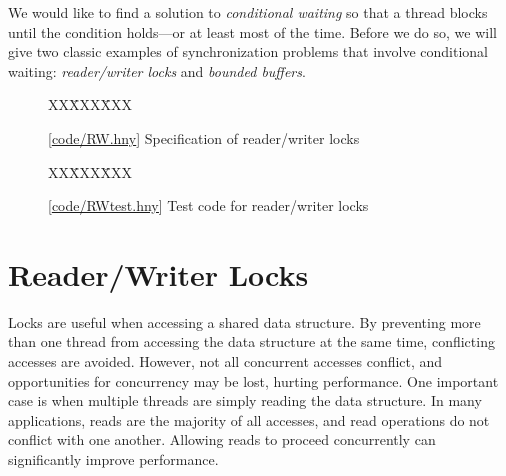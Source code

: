\documentclass{report}
\newcommand{\harmonysource}[1]{
\begin{tabbing}
XX\=XXX\=XXX\kill
    
\end{tabbing}
}
\newcommand{\harmonylink}[1]{%
[\href{https://harmony.cs.cornell.edu/#1}{\underline{#1}}]%
}
\newenvironment{code}{
\tcolorbox
}{
\endtcolorbox
}
\begin{document}
We would like to find a solution to \emph{conditional waiting}
so that a thread blocks until the condition holds---or at least most
of the time.
Before we do so, we will give two classic examples of synchronization
problems that involve conditional waiting: \emph{reader/writer locks}
and \emph{bounded buffers}.

\begin{figure}
\begin{code}
\harmonysource{RW}
\end{code}
\caption{\harmonylink{code/RW.hny} Specification of reader/writer locks}
\label{fig:rwspec}
\end{figure}

\begin{figure}
\begin{code}
\harmonysource{RWtest}
\end{code}
\caption{\harmonylink{code/RWtest.hny} Test code for reader/writer locks}
\label{fig:rwtest}
\end{figure}

\section{Reader/Writer Locks}
%
%

Locks are useful when accessing a shared data structure.  By preventing
more than one thread from accessing the data structure at the same
time, conflicting accesses are avoided.  However, not all concurrent
accesses conflict, and opportunities for concurrency may be lost,
hurting performance.  One important case is when multiple threads
are simply reading the data structure.
In many applications, reads are the majority of all accesses,
and read operations do not conflict with one another.
Allowing reads to proceed concurrently can significantly improve performance.
\end{document}
